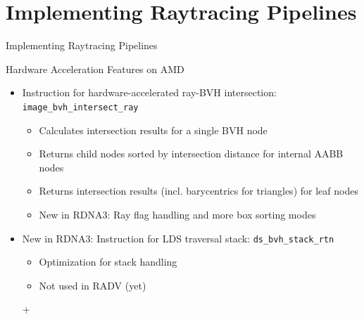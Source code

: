 \documentclass[aspectratio=169,t]{beamer}
\begin{document}
\section{Implementing Raytracing Pipelines}

\chapterIntroConfig
\begin{slide}{Implementing Raytracing Pipelines}
\end{slide}

\begin{slide}{Hardware Acceleration Features on AMD}
 \begin{itemize}
  \item Instruction for hardware-accelerated ray-BVH intersection: \texttt{image\_bvh\_intersect\_ray}
  \begin{itemize}
   \item Calculates intersection results for a single BVH node
   \item Returns child nodes sorted by intersection distance for internal AABB nodes
   \item Returns intersection results (incl. barycentrics for triangles) for leaf nodes
   \item New in RDNA3: Ray flag handling and more box sorting modes
  \end{itemize}
 \end{itemize}
 \begin{itemize}
  \item New in RDNA3: Instruction for LDS traversal stack: \texttt{ds\_bvh\_stack\_rtn}
  \begin{itemize}
   \item Optimization for stack handling
   \item Not used in RADV (yet)
  \end{itemize}+
 \end{itemize}
\end{slide}
\end{document}
